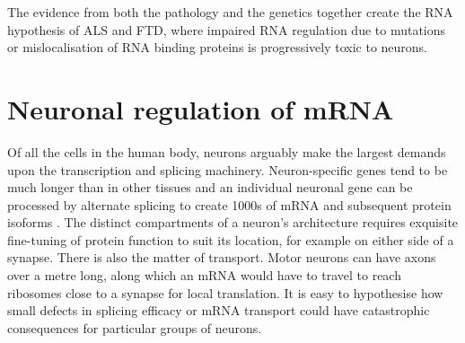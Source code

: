 The evidence from both the pathology and the genetics together create the RNA hypothesis of ALS and FTD, where impaired RNA regulation due to mutations or mislocalisation of RNA binding proteins is progressively toxic to neurons.

%
%
%
%


%
%
%




\section{Neuronal regulation of mRNA} %
%

Of all the cells in the human body, neurons arguably make the largest demands upon the transcription and splicing machinery. Neuron-specific genes tend to be much longer than in other tissues \citep{Sibley2015} and an individual neuronal gene can be processed by alternate splicing to create 1000s of mRNA and subsequent protein isoforms \citep{Treutlein2014}. The distinct compartments of a neuron's architecture requires exquisite fine-tuning of protein function to suit its location, for example on either side of a synapse. There is also the matter of transport. Motor neurons can have axons over a metre long, along which an mRNA would have to travel to reach ribosomes close to a synapse for local translation. It is easy to hypothesise how small defects in splicing efficacy or mRNA transport could have catastrophic consequences for particular groups of neurons. 


